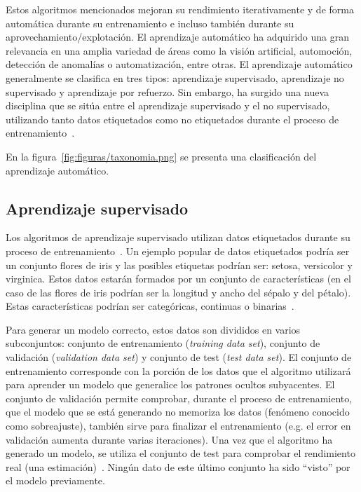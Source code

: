 Estos algoritmos mencionados mejoran su rendimiento iterativamente y de forma automática durante su entrenamiento e incluso también durante su aprovechamiento/explotación. El aprendizaje automático ha adquirido una gran relevancia en una amplia variedad de áreas como la visión artificial, automoción, detección de anomalías o automatización, entre otras. El aprendizaje automático generalmente se clasifica en tres tipos: aprendizaje supervisado, aprendizaje no supervisado y aprendizaje por refuerzo. Sin embargo, ha surgido una nueva disciplina que se sitúa entre el aprendizaje supervisado y el no supervisado, utilizando tanto datos etiquetados como no etiquetados durante el proceso de entrenamiento~\cite{vanEngelen2020}.

En la figura~\ref{fig:figuras/taxonomia.png} se presenta una clasificación del aprendizaje automático.


\subsection{Aprendizaje supervisado}
\label{aprendizaje-supervisado}

Los algoritmos de aprendizaje supervisado utilizan datos etiquetados durante su proceso de entrenamiento~\cite{david:sl}. Un ejemplo popular de datos etiquetados podría ser un conjunto flores de iris y las posibles etiquetas podrían ser: setosa, versicolor y virginica. Estos datos estarán formados por un conjunto de características (en el caso de las flores de iris podrían ser la longitud y ancho del sépalo y del pétalo). Estas características podrían ser categóricas, continuas o binarias~\cite{salim:sl}.

Para generar un modelo correcto, estos datos son divididos en varios subconjuntos: conjunto de entrenamiento (\textit{training data set}), conjunto de validación (\textit{validation data set}) y conjunto de test (\textit{test data set}). El conjunto de entrenamiento corresponde con la porción de los datos que el algoritmo utilizará para aprender un modelo que generalice los patrones ocultos subyacentes. El conjunto de validación permite comprobar, durante el proceso de entrenamiento, que el modelo que se está generando no memoriza los datos (fenómeno conocido como sobreajuste), también sirve para finalizar el entrenamiento (e.g. el error en validación aumenta durante varias iteraciones). Una vez que el algoritmo ha generado un modelo, se utiliza el conjunto de test para comprobar el rendimiento real (una estimación)~\cite{enwiki:conjuntos}. Ningún dato de este último conjunto ha sido ``visto'' por el modelo previamente.


